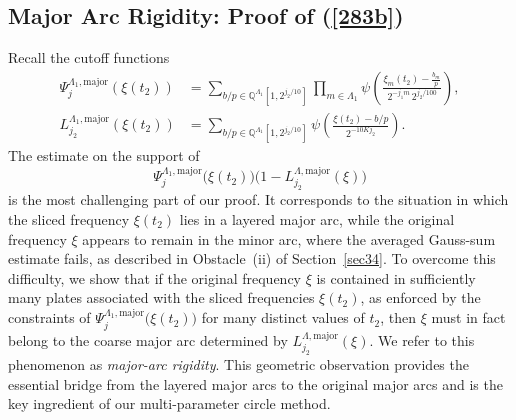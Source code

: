 \documentclass[10pt,a4paper]{amsart}
\numberwithin{equation}{section}
\begin{document}
\subsection{Major Arc Rigidity: Proof of (\ref{283b})}\label{sec5.3}
Recall the cutoff functions
\begin{align*}
	\Psi_j^{\Lambda_1,\mathrm{major}}(\xi(t_2))
	&= \sum_{b/p\in \mathbb{Q}^{\Lambda_1}[1,2^{j_2/10}]}
	\prod_{m\in \Lambda_1}
	\psi\!\left(
	\frac{\xi_m(t_2)-\frac{b_m}{p}}
	{2^{-j_1 m}\,2^{j_2/100}}
	\right),\\
	L^{\Lambda_1,\mathrm{major}}_{j_2}(\xi(t_2)) &=\sum_{b/p\in \mathbb{Q}^{\Lambda_1}[1,2^{j_2/10}]  }  \psi\left(\frac{\xi(t_2)-b/p}{2^{-10Kj_2}}\right).
\end{align*}
The estimate on the support of
\[
\Psi_{j}^{\Lambda_1,\mathrm{major}}\!\bigl(\xi(t_2)\bigr)
\bigl(1-L^{\Lambda,\mathrm{major}}_{j_2}(\xi)\bigr)
\]
is the most challenging part of our proof. It corresponds to the situation in which the sliced frequency $\xi(t_2)$ lies in a layered major arc, while the original frequency $\xi$ appears to remain in the minor arc, where the averaged Gauss-sum estimate fails, as described in Obstacle~(ii) of Section~\ref{sec34}. To overcome this difficulty, we show that if the original frequency $\xi$ is contained in sufficiently many plates associated with the sliced frequencies $\xi(t_2)$, as enforced by the constraints of
$\Psi_{j}^{\Lambda_1,\mathrm{major}}\!\bigl(\xi(t_2)\bigr)$
for many distinct values of $t_2$, then $\xi$ must in fact belong to the coarse major arc determined by
$L^{\Lambda,\mathrm{major}}_{j_2}(\xi)$. We refer to this phenomenon as \emph{major-arc rigidity}.
This geometric observation provides the essential bridge from the layered major arcs to the original major arcs and is the key ingredient of our multi-parameter circle method. 



 
\end{document}
